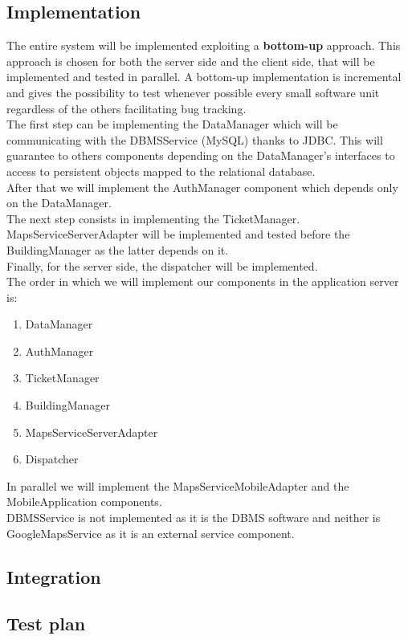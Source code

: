 \subsection{Implementation}

The entire system will be implemented exploiting a \textbf{bottom-up} approach. This approach is chosen for both the server side and the client side, that will be implemented and tested in parallel. A bottom-up implementation is incremental and gives the possibility to test whenever possible every small software unit regardless of the others facilitating bug tracking.\\
\newline
The first step can be implementing the DataManager which will be communicating with the DBMSService (MySQL) thanks to JDBC. This will guarantee to others components depending on the DataManager's interfaces to access to persistent objects mapped to the relational database.\\
\newline
After that we will implement the AuthManager component which depends only on the DataManager.\\
The next step consists in implementing the TicketManager.\\
MapsServiceServerAdapter will be implemented and tested before the BuildingManager as the latter depends on it.\\
\newline
Finally, for the server side, the dispatcher will be implemented.\\
\newline
The order in which we will implement our components in the application server is:

\begin{enumerate}[label=\arabic*]
 \item DataManager
 \item AuthManager
 \item TicketManager
 \item BuildingManager
 \item MapsServiceServerAdapter
 \item Dispatcher
\end{enumerate}

In parallel we will implement the MapsServiceMobileAdapter and the MobileApplication components.\\
\newline
DBMSService is not implemented as it is the DBMS software and neither is GoogleMapsService as it is an external service component.\\
\newline

\subsection{Integration}




\subsection{Test plan}
